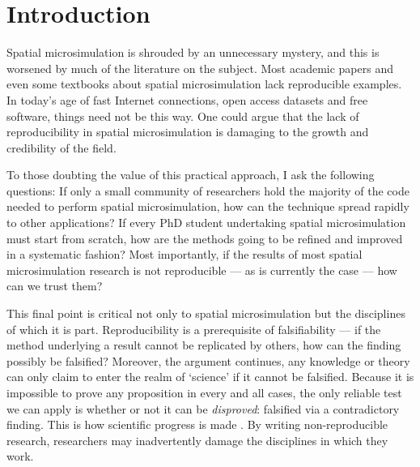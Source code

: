 \documentclass[a5paper, 11pt, twoside]{book}  %
\begin{document}
% 

\chapter{Introduction}

Spatial microsimulation is shrouded by an unnecessary mystery, and this is worsened
by much of the literature on the subject. Most academic papers and even some textbooks
about spatial microsimulation lack reproducible examples. In today's age of fast
Internet connections, open access datasets and free software,
things need not be this way. One could argue that the lack of
reproducibility in spatial microsimulation is damaging to the growth
and credibility of the field.

To those doubting the value of this practical approach, I ask the following
questions: If only a small community of researchers hold the majority of the
code needed to perform spatial microsimulation, how can the technique spread
rapidly to other applications? If every PhD student undertaking spatial
microsimulation must start from scratch, how are the methods going to be
refined and improved in a systematic fashion? Most importantly, if the results
of most spatial microsimulation research is not reproducible --- as is currently
the case --- how can we trust them?

This final point is critical not only to spatial microsimulation but the
disciplines of which it is part. Reproducibility is a prerequisite of
falsifiability --- if the method
underlying a result cannot be replicated by others, how can the finding
possibly be falsified? Moreover, the argument continues, any knowledge or
theory can only claim to enter the realm of `science' if it cannot be falsified.
Because it is impossible to prove any proposition in every and all cases, the
only reliable test we can apply is whether or not it can be \emph{disproved}:
falsified via a contradictory finding. This is how scientific progress is made
\citep{Popper1959}. By writing non-reproducible research, researchers may
inadvertently damage the disciplines in which they work. %
\end{document}

